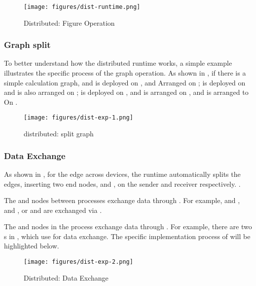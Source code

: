 \begin{content}
\begin{figure}[H]
  \centering
  \texttt{[image: figures/dist-runtime.png]}
  \caption{Distributed: Figure Operation}
  \label{fig:dist-runtime}
\end{figure}


\subsubsection{Graph split}
To better understand how the distributed runtime works, a simple example illustrates the specific process of the graph operation. As shown in , if there is a simple calculation graph, and  is deployed on , and Arranged on ;  is deployed on  and is also arranged on ;  is deployed on , and  is arranged on , and  is arranged to On .

\begin{figure}[H]
  \centering
  \texttt{[image: figures/dist-exp-1.png]}
  \caption{distributed: split graph}
  \label{fig:dist-exp-1}
\end{figure}


\subsubsection{Data Exchange}
As shown in , for the edge across devices, the runtime automatically splits the edges, inserting two end nodes,  and , on the sender and receiver respectively. .

The  and  nodes between processes exchange data through . For example,  and , and , or  and  are exchanged via .

The  and  nodes in the process exchange data through . For example, there are two s in , which use  for data exchange. The specific implementation process of  will be highlighted below.

\begin{figure}[H]
  \centering
  \texttt{[image: figures/dist-exp-2.png]}
  \caption{Distributed: Data Exchange}
  \label{fig:dist-exp-2}
\end{figure}



\end{content}
